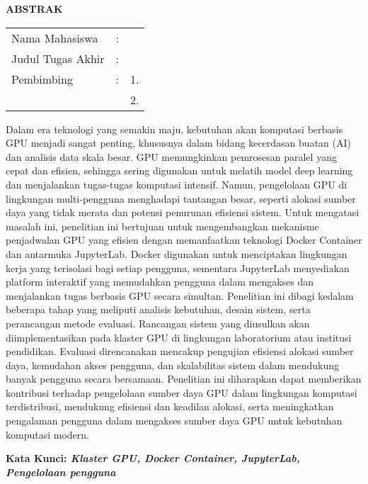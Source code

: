 \begin{center}
  \large\textbf{ABSTRAK}
\end{center}


\vspace{2ex}

\begingroup
\setlength{\tabcolsep}{0pt}

\noindent
\begin{tabularx}{\textwidth}{l >{\centering}m{2em} X}
  Nama Mahasiswa    & : & \name{}         \\

  Judul Tugas Akhir & : & \tatitle{}      \\

  Pembimbing        & : & 1. \advisor{}   \\
                    &   & 2. \coadvisor{} \\
\end{tabularx}
\endgroup

Dalam era teknologi yang semakin maju, kebutuhan akan komputasi berbasis GPU menjadi
sangat penting, khususnya dalam bidang kecerdasan buatan (AI) dan analisis data skala besar. GPU memungkinkan pemrosesan paralel yang cepat dan efisien, sehingga sering digunakan untuk melatih model deep learning dan menjalankan tugas-tugas komputasi intensif. Namun, pengelolaan GPU di lingkungan multi-pengguna menghadapi tantangan besar, seperti alokasi sumber daya yang tidak merata dan potensi penurunan efisiensi sistem. Untuk mengatasi masalah ini, penelitian ini bertujuan untuk mengembangkan mekanisme penjadwalan GPU yang efisien dengan memanfaatkan teknologi Docker Container dan antarmuka JupyterLab. Docker digunakan untuk menciptakan lingkungan kerja yang terisolasi bagi setiap pengguna, sementara
JupyterLab menyediakan platform interaktif yang memudahkan pengguna dalam mengakses dan menjalankan tugas berbasis GPU secara simultan. Penelitian ini dibagi kedalam beberapa tahap yang meliputi analisis kebutuhan, desain sistem, serta perancangan metode evaluasi. Rancangan sistem yang diusulkan akan diimplementasikan pada klaster GPU di lingkungan laboratorium atau institusi pendidikan. Evaluasi direncanakan mencakup pengujian efisiensi alokasi sumber daya, kemudahan akses pengguna, dan skalabilitas sistem dalam mendukung banyak pengguna secara bersamaan. Penelitian ini diharapkan dapat memberikan kontribusi terhadap pengelolaan sumber daya GPU dalam lingkungan komputasi terdistribusi, mendukung efisiensi dan keadilan alokasi, serta meningkatkan pengalaman pengguna dalam mengakses sumber daya GPU untuk kebutuhan komputasi modern.

\textbf{Kata Kunci: \textit{Klaster GPU, Docker Container, JupyterLab, Pengelolaan pengguna}}
